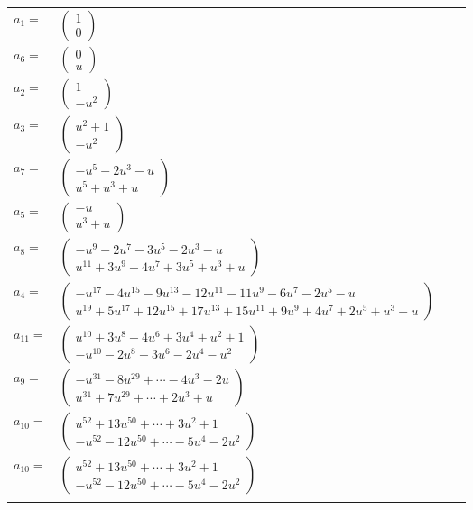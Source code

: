 \documentclass[1p]{elsarticle_modified}
\theoremstyle{definition}
\begin{document}
\begin{tabular}{m{7pt} m{180pt} m{7pt} m{180pt} }
\flushright $a_{1}=$&$\begin{pmatrix}1\\0\end{pmatrix}$ \\
\flushright $a_{6}=$&$\begin{pmatrix}0\\u\end{pmatrix}$ \\
\flushright $a_{2}=$&$\begin{pmatrix}1\\- u^2\end{pmatrix}$ \\
\flushright $a_{3}=$&$\begin{pmatrix}u^2+1\\- u^2\end{pmatrix}$ \\
\flushright $a_{7}=$&$\begin{pmatrix}- u^5-2 u^3- u\\u^5+u^3+u\end{pmatrix}$ \\
\flushright $a_{5}=$&$\begin{pmatrix}- u\\u^3+u\end{pmatrix}$ \\
\flushright $a_{8}=$&$\begin{pmatrix}- u^9-2 u^7-3 u^5-2 u^3- u\\u^{11}+3 u^9+4 u^7+3 u^5+u^3+u\end{pmatrix}$ \\
\flushright $a_{4}=$&$\begin{pmatrix}- u^{17}-4 u^{15}-9 u^{13}-12 u^{11}-11 u^9-6 u^7-2 u^5- u\\u^{19}+5 u^{17}+12 u^{15}+17 u^{13}+15 u^{11}+9 u^9+4 u^7+2 u^5+u^3+u\end{pmatrix}$ \\
\flushright $a_{11}=$&$\begin{pmatrix}u^{10}+3 u^8+4 u^6+3 u^4+u^2+1\\- u^{10}-2 u^8-3 u^6-2 u^4- u^2\end{pmatrix}$ \\
\flushright $a_{9}=$&$\begin{pmatrix}- u^{31}-8 u^{29}+\cdots-4 u^3-2 u\\u^{31}+7 u^{29}+\cdots+2 u^3+u\end{pmatrix}$ \\
\flushright $a_{10}=$&$\begin{pmatrix}u^{52}+13 u^{50}+\cdots+3 u^2+1\\- u^{52}-12 u^{50}+\cdots-5 u^4-2 u^2\end{pmatrix}$\\ \flushright $a_{10}=$&$\begin{pmatrix}u^{52}+13 u^{50}+\cdots+3 u^2+1\\- u^{52}-12 u^{50}+\cdots-5 u^4-2 u^2\end{pmatrix}$\\&\end{tabular}
\end{document}
